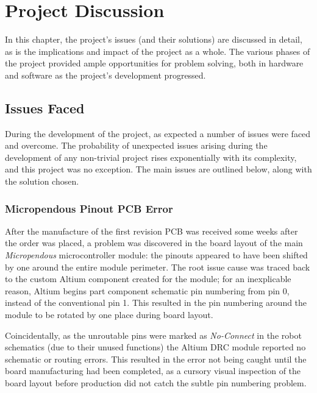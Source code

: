 \chapter{Project Discussion}
\label{chp:discussion}

In this chapter, the project's issues (and their solutions) are discussed in detail, as is the implications and impact of the project as a whole. The various phases of the project provided ample opportunities for problem solving, both in hardware and software as the project's development progressed.

\section{Issues Faced}

During the development of the project, as expected a number of issues were faced and overcome. The probability of unexpected issues arising during the development of any non-trivial project rises exponentially with its complexity, and this project was no exception. The main issues are outlined below, along with the solution chosen.

\FloatBarrier
\subsection{Micropendous Pinout PCB Error}

After the manufacture of the first revision PCB was received some weeks after the order was placed, a problem was discovered in the board layout of the main \textit{Micropendous} microcontroller module: the pinouts appeared to have been shifted by one around the entire module perimeter. The root issue cause was traced back to the custom Altium component created for the module; for an inexplicable reason, Altium begins part component schematic pin numbering from pin 0, instead of the conventional pin 1. This resulted in the pin numbering around the module to be rotated by one place during board layout.


Coincidentally, as the unroutable pins were marked as \textit{No-Connect} in the robot schematics (due to their unused functions) the Altium DRC module reported no schematic or routing errors. This resulted in the error not being caught until the board manufacturing had been completed, as a cursory visual inspection of the board layout before production did not catch the subtle pin numbering problem.

